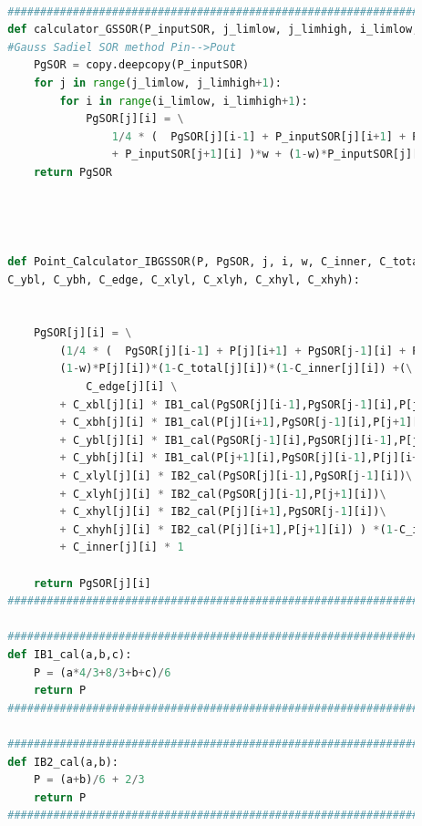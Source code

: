 \documentclass[12pt]{article}
\begin{document}
\begin{scriptsize}
    \begin{lstlisting}[language=python,caption={Python code-Functions for iteration Calculator}]
    
        ##########################################################################################
        def calculator_GSSOR(P_inputSOR, j_limlow, j_limhigh, i_limlow, i_limhigh , w): 
        #Gauss Sadiel SOR method Pin-->Pout
            PgSOR = copy.deepcopy(P_inputSOR)
            for j in range(j_limlow, j_limhigh+1):
                for i in range(i_limlow, i_limhigh+1): 
                    PgSOR[j][i] = \
                        1/4 * (  PgSOR[j][i-1] + P_inputSOR[j][i+1] + PgSOR[j-1][i] \
                        + P_inputSOR[j+1][i] )*w + (1-w)*P_inputSOR[j][i]
            return PgSOR
        
        
        
        
        def Point_Calculator_IBGSSOR(P, PgSOR, j, i, w, C_inner, C_total, C_xbl, C_xbh, \
        C_ybl, C_ybh, C_edge, C_xlyl, C_xlyh, C_xhyl, C_xhyh):
            
        
            PgSOR[j][i] = \
                (1/4 * (  PgSOR[j][i-1] + P[j][i+1] + PgSOR[j-1][i] + P[j+1][i] )*w + \
                (1-w)*P[j][i])*(1-C_total[j][i])*(1-C_inner[j][i]) +(\
                    C_edge[j][i] \
                + C_xbl[j][i] * IB1_cal(PgSOR[j][i-1],PgSOR[j-1][i],P[j+1][i])\
                + C_xbh[j][i] * IB1_cal(P[j][i+1],PgSOR[j-1][i],P[j+1][i])\
                + C_ybl[j][i] * IB1_cal(PgSOR[j-1][i],PgSOR[j][i-1],P[j][i+1])\
                + C_ybh[j][i] * IB1_cal(P[j+1][i],PgSOR[j][i-1],P[j][i+1])\
                + C_xlyl[j][i] * IB2_cal(PgSOR[j][i-1],PgSOR[j-1][i])\
                + C_xlyh[j][i] * IB2_cal(PgSOR[j][i-1],P[j+1][i])\
                + C_xhyl[j][i] * IB2_cal(P[j][i+1],PgSOR[j-1][i])\
                + C_xhyh[j][i] * IB2_cal(P[j][i+1],P[j+1][i]) ) *(1-C_inner[j][i])\
                + C_inner[j][i] * 1
            
            return PgSOR[j][i]
        ##########################################################################################
        
        ##########################################################################################
        def IB1_cal(a,b,c):
            P = (a*4/3+8/3+b+c)/6
            return P
        ##########################################################################################
        
        ##########################################################################################
        def IB2_cal(a,b):
            P = (a+b)/6 + 2/3
            return P
        ##########################################################################################
            


\end{lstlisting}
\end{scriptsize}
\end{document}
